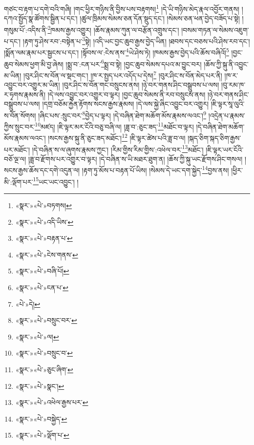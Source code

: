 གཙང་བ་རྟག་པ་དགེ་བའི་གཞི། །གང་ཕྱིར་གཉིས་ནི་བྱིས་པས་བརྟགས།\footnote{«སྣར་»«པེ་»བཏགས།} །དེ་ཡི་གཉིས་མེད་རྣལ་འབྱོར་གནས། །དཀའ་སྤྱོད་སྣ་ཚོགས་སྦྱིན་པ་དང་། །ཚུལ་ཁྲིམས་སེམས་ཅན་དོན་སྡུད་དང་། །སེམས་ཅན་ཕན་བྱེད་བཟོད་པ་སྟེ། །གསུམ་པོ་:འདིས་ནི་\footnote{«སྣར་»«པེ་»འདི་ཡིས་}ཁམས་རྒྱས་འགྱུར། །ཆོས་རྣམས་ཀུན་ལ་བརྩོན་འགྲུས་དང་། །བསམ་གཏན་ལ་སེམས་འཇུག་པ་དང་། །རྟག་ཏུ་ཤེས་རབ་:བསྟེན་པ་\footnote{«སྣར་»«པེ་»བརྟན་པ་}སྟེ། །འདི་ཡང་བྱང་ཆུབ་རྒྱས་བྱེད་ཡིན། །ཐབས་དང་བཅས་པའི་ཤེས་རབ་དང་། །སྨོན་ལམ་རྣམ་པར་སྦྱངས་པ་དང་། །སྟོབས་ལ་:ངེས་ནས་\footnote{«སྣར་»«པེ་»ངེས་གནས་}ཡེ་ཤེས་ཏེ། །ཁམས་རྒྱས་བྱེད་པའི་ཆོས་བཞིའོ།\footnote{«སྣར་»«པེ་»བཞི་པོ།} །བྱང་ཆུབ་སེམས་ཕྱག་མི་བྱ་ཞེས། །སྨྲ་བ་:ངན་པར་\footnote{«སྣར་»«པེ་»ངན་པ་}སྨྲ་བ་སྟེ། །བྱང་ཆུབ་སེམས་དཔའ་མ་བྱུང་བར། །ཆོས་ཀྱི་སྐུ་ནི་འབྱུང་མ་ཡིན། །བུར་ཤིང་ས་བོན་ལ་སྡང་གང་། །ཁ་ར་སྤྱད་པར་འདོད་པ་དེས།\footnote{«པེ་»དེ།} །བུར་ཤིང་ས་བོན་མེད་པར་ནི། །ཁ་ར་འབྱུང་བར་འགྱུར་མ་ཡིན། །བུར་ཤིང་ས་བོན་གང་བསྲུངས་ནས། །ཉེ་བར་གནས་ཤིང་བསྒྲུབས་པ་ལས། །བུ་རམ་ཁ་ར་ཧྭགས་རྣམས་ནི། །དེ་ལས་འབྱུང་བར་འགྱུར་བ་ལྟར། །བྱང་ཆུབ་སེམས་ནི་རབ་བསྲུངས་ནས། །ཉེ་བར་གནས་ཤིང་བསྒྲུབས་པ་ལས། །དགྲ་བཅོམ་རྐྱེན་རྟོགས་སངས་རྒྱས་རྣམས། །དེ་ལས་སྐྱེ་ཞིང་འབྱུང་བར་འགྱུར། །ཇི་ལྟར་སཱ་ལུའི་ས་བོན་སོགས། །ཞིང་པས་:སྲུང་བར་\footnote{«སྣར་»«པེ་»བསྲུང་བར་}བྱེད་པ་ལྟར། །དེ་བཞིན་ཐེག་མཆོག་མོས་རྣམས་ལའང་།\footnote{«སྣར་»«པེ་»ལ།} །འདྲེན་པ་རྣམས་ཀྱིས་སྲུང་བར་\footnote{«སྣར་»«པེ་»བསྲུང་བ་}མཛད། །ཇི་ལྟར་མར་ངོའི་བཅུ་བཞི་ལ། །ཟླ་བ་:ཅུང་ཟད་\footnote{«སྣར་»«པེ་»ཅུང་ཞིག་}མཐོང་བ་ལྟར། །དེ་བཞིན་ཐེག་མཆོག་མོས་རྣམས་ལའང་། །སངས་རྒྱས་སྐུ་ནི་ཅུང་ཟད་མཐོང་།\footnote{«སྣར་»«པེ་»སྣང་།} །ཇི་ལྟར་ཚེས་པའི་ཟླ་བ་ལ། །སྐད་ཅིག་སྐད་ཅིག་རྒྱས་པར་མཐོང་། །དེ་བཞིན་ས་ལ་ཞུགས་རྣམས་ཀྱང་། །རིམ་གྱིས་རིམ་གྱིས་:འཕེལ་བར་\footnote{«སྣར་»«པེ་»འཕེལ་རྒྱས་པར་}མཐོང་། །ཇི་ལྟར་ཡར་ངོའི་བཅོ་ལྔ་ལ། །ཟླ་བ་རྫོགས་པར་འགྱུར་བ་ལྟར། །དེ་བཞིན་ས་ཡི་མཐར་ཐུག་ན། །ཆོས་ཀྱི་སྐུ་ཡང་རྫོགས་ཤིང་གསལ། །སངས་རྒྱས་ཆོས་དང་དགེ་འདུན་ལ། །རྟག་ཏུ་མོས་པ་བརྟན་པོ་ཡིས། །སེམས་དེ་ཡང་དག་སྐྱེད་\footnote{«སྣར་»«པེ་»བསྐྱེད་}བྱས་ནས། །ཕྱིར་མི་:ལྡོག་པར་\footnote{«སྣར་»«པེ་»ལྡོག་པ་}ཡང་ཡང་འབྱུང་། །

